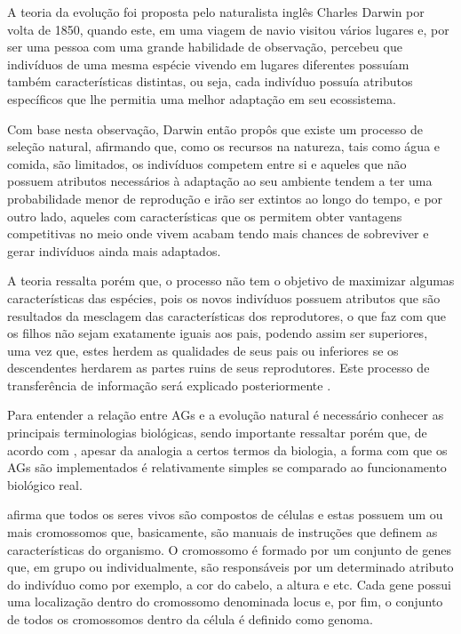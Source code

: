 \par A teoria da evolução foi proposta pelo naturalista inglês Charles
Darwin por volta de 1850, quando este, em uma viagem de navio visitou vários lugares e, 
por ser uma pessoa com uma grande habilidade de  observação, percebeu que
indivíduos de uma mesma espécie vivendo em lugares diferentes possuíam também
características distintas, ou seja, cada indivíduo  possuía atributos
específicos que lhe permitia uma melhor adaptação em seu ecossistema. 


\par Com base nesta observação, Darwin então propôs que existe um processo de
seleção natural, afirmando que, como os recursos na natureza, tais como água e comida,
são limitados, os indivíduos competem entre si e aqueles que não possuem atributos necessários
à adaptação ao seu ambiente tendem a ter uma probabilidade menor de reprodução e
irão ser extintos ao longo do tempo, e por outro lado, aqueles
com características que os permitem obter vantagens competitivas no meio onde
vivem acabam tendo mais chances de sobreviver e gerar indivíduos ainda mais
adaptados. 

\par A teoria ressalta porém que, o processo não tem o objetivo de maximizar
algumas características das espécies, pois  os novos indivíduos
possuem atributos que são resultados da mesclagem das características dos reprodutores,
o que faz com que os filhos não sejam exatamente iguais aos pais, podendo assim
ser superiores, uma vez que, estes herdem as qualidades de seus pais ou
inferiores se os descendentes herdarem as partes ruins de seus
reprodutores. Este processo de transferência de informação será explicado
posteriormente \cite{livro_ags_ricardo_linden}.

\par Para entender a relação entre AGs e a evolução natural é
necessário conhecer as principais terminologias biológicas, 
sendo importante ressaltar porém que, de acordo com
, apesar da 
analogia a certos termos da biologia, a forma com que os AGs 
são implementados é relativamente simples se comparado ao funcionamento
biológico real.

\par {} afirma que 
todos os seres vivos são compostos de células e estas possuem um ou mais
cromossomos que, basicamente, são manuais de instruções que definem as 
características do organismo. O cromossomo é formado por um conjunto de genes
que, em grupo ou individualmente, são responsáveis por um determinado atributo
do indivíduo como por exemplo, a cor do cabelo, a altura e etc. Cada gene possui
uma localização dentro do cromossomo denominada locus e, por fim, o conjunto de
todos os cromossomos dentro da célula é definido como genoma. 

